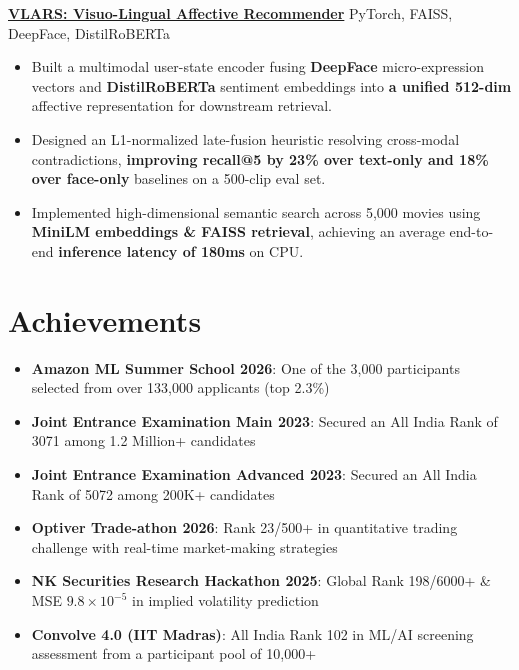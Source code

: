 \documentclass[10.5pt, a4paper]{article}
\newcommand{\resumeItem}[1]{\item[\textbullet] #1}
\newcommand{\projEntry}[2]{%
    \hspace*{-16pt}\textbf{#1} \hfill #2 \\[-4pt]
    \vspace{-8pt}
}
\begin{document}
\projEntry
    {\href{https://github.com/hamza-faarooq/vlars}{VLARS: Visuo-Lingual Affective Recommender}}{PyTorch, FAISS, DeepFace, DistilRoBERTa}
\begin{itemize}[leftmargin=-1pt, itemsep=1pt, topsep=-2pt, parsep=0pt]
    \resumeItem{Built a multimodal user-state encoder fusing \textbf{DeepFace} micro-expression vectors and \textbf{DistilRoBERTa} sentiment embeddings into \textbf{a unified 512-dim} affective representation for downstream retrieval.}
  
  \resumeItem{Designed an L1-normalized late-fusion heuristic resolving cross-modal contradictions, \textbf{improving recall@5 by 23\% over text-only and 18\% over face-only} baselines on a 500-clip eval set.}
  
  \resumeItem{Implemented high-dimensional semantic search across 5,000 movies using \textbf{MiniLM embeddings \& FAISS retrieval}, achieving an average end-to-end \textbf{inference latency of 180ms} on CPU.}
\end{itemize}



\section{Achievements}
\begin{itemize}[leftmargin=-1pt, itemsep=1pt, topsep=-2pt, parsep=0pt]

    \resumeItem{\textbf{Amazon ML Summer School 2026}: One of the 3,000 participants selected from over 133,000 applicants (top 2.3\%)
}

    \resumeItem{\textbf{Joint Entrance Examination Main 2023}: Secured an All India Rank of 3071 among 1.2 Million+ candidates}
    \resumeItem{\textbf{Joint Entrance Examination Advanced 2023}: Secured an All India Rank of 5072 among 200K+ candidates}
    \resumeItem{\textbf{Optiver Trade-athon 2026}: Rank 23/500+ in quantitative trading challenge with real-time market-making strategies}
    \resumeItem{\textbf{NK Securities Research Hackathon 2025}: Global Rank 198/6000+ \& MSE $9.8 \times 10^{-5}$ in implied volatility prediction}
    \resumeItem{\textbf{Convolve 4.0 (IIT Madras)}: All India Rank 102 in ML/AI screening assessment from a participant pool of 10,000+}
\end{itemize}



\end{document}

